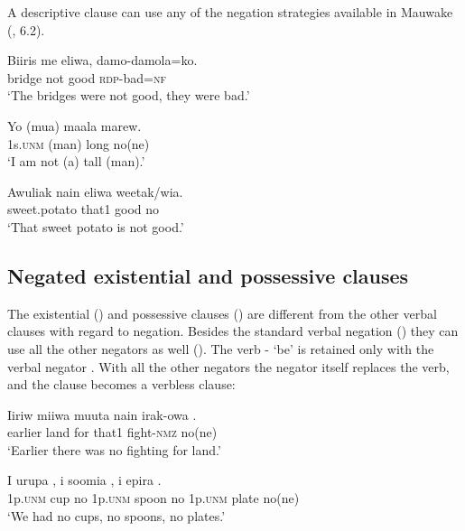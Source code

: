 A descriptive clause can use any of the negation strategies available in Mauwake (, 6.2). 

\ea%
\label{ex:x990}
\gll Biiris  me  eliwa,  damo-damola=ko. \\
     bridge  not  good  \textsc{rdp}-bad=\textsc{nf} \\
\glt `The bridges were not good, they were bad.'
\z

\ea%
\label{ex:x988}
\gll Yo  (mua)  maala  marew. \\
     1s.\textsc{unm}  (man)  long  no(ne) \\
\glt `I am not (a) tall (man).'
\z

\ea%
\label{ex:x989}
\gll Awuliak  nain  eliwa  weetak/wia. \\
     sweet.potato  that1  good  no \\
\glt `That sweet potato is not good.'
\z

\subsection{Negated existential and possessive clauses}
\hypertarget{RefHeading22221935131865}{}
The existential () and possessive clauses () are different from the other verbal clauses with regard to negation. Besides the standard verbal negation () they can use all the other negators as well (). The verb - `be' is retained only with the verbal negator . With all the other negators the negator itself replaces the verb, and the clause becomes a verbless clause:

\ea%
\label{ex:x982}
\gll Iiriw  miiwa  muuta  nain  irak-owa  . \\
     earlier  land  for  that1  fight-\textsc{nmz}  no(ne) \\
\glt `Earlier there was no fighting for land.'
\z

\ea%
\label{ex:x983}
\gll I  urupa  ,  i  soomia  ,  i epira  . \\
     1p.\textsc{unm}  cup  no  1p.\textsc{unm}  spoon  no  1p.\textsc{unm} plate  no(ne) \\
\glt `We had no cups, no spoons, no plates.'
\z

